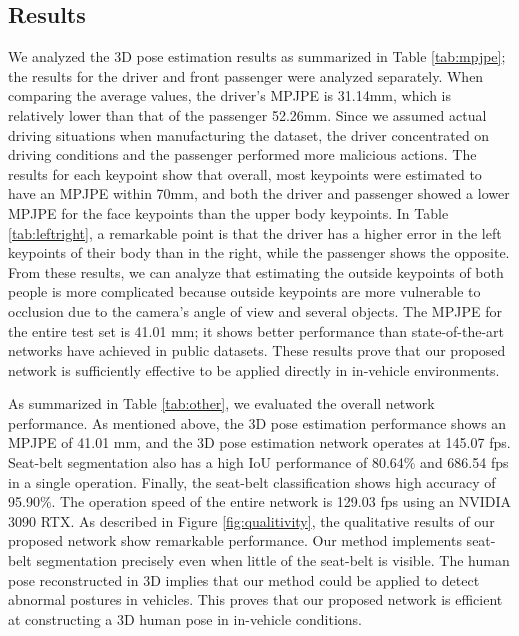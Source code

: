 \documentclass[letterpaper]{article} %
\begin{document}
\subsection{Results}
We analyzed the 3D pose estimation results as summarized in Table \ref{tab:mpjpe}; the results for the driver and front passenger were analyzed separately. When comparing the average values, the driver's MPJPE is 31.14mm, which is relatively lower than that of the passenger 52.26mm. Since we assumed actual driving situations when manufacturing the dataset, the driver concentrated on driving conditions and the passenger performed more malicious actions. The results for each keypoint show that overall, most keypoints were estimated to have an MPJPE within 70mm, and both the driver and passenger showed a lower MPJPE for the face keypoints than the upper body keypoints. In Table \ref{tab:leftright}, a remarkable point is that the driver has a higher error in the left keypoints of their body than in the right, while the passenger shows the opposite. From these results, we can analyze that estimating the outside keypoints of both people is more complicated because outside keypoints are more vulnerable to occlusion due to the camera's angle of view and several objects. The MPJPE for the entire test set is 41.01 mm; it shows better performance than state-of-the-art networks have achieved in public datasets. These results prove that our proposed network is sufficiently effective to be applied directly in in-vehicle environments.

As summarized in Table \ref{tab:other}, we evaluated the overall network performance. As mentioned above, the 3D pose estimation performance shows an MPJPE of 41.01 mm, and the 3D pose estimation network operates at 145.07 fps. Seat-belt segmentation also has a high IoU performance of 80.64\% and 686.54 fps in a single operation. Finally, the seat-belt classification shows high accuracy of 95.90\%. The operation speed of the entire network is 129.03 fps using an NVIDIA 3090 RTX. As described in Figure \ref{fig:qualitivity}, the qualitative results of our proposed network show remarkable performance. Our method implements seat-belt segmentation precisely even when little of the seat-belt is visible. The human pose reconstructed in 3D implies that our method could be applied to detect abnormal postures in vehicles. This proves that our proposed network is efficient at constructing a 3D human pose in in-vehicle conditions.
\end{document}
